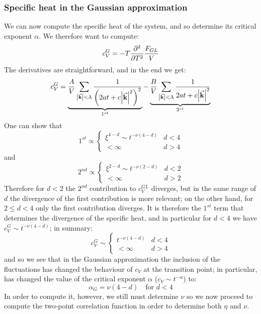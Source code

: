 \documentclass[../main/main.tex]{subfiles}
\begin{document}
\subsubsection{Specific heat in the Gaussian approximation}
We can now compute the specific heat of the system, and so determine its critical exponent \( \alpha  \). We therefore want to compute:
\begin{equation*}
    c_V^{G} = - T \pdv[2]{}{T} \frac{F_{GL}}{V}
\end{equation*}
The derivatives are straightforward, and in the end we get:
\begin{equation*}
  c_V^{G} =   \underbrace{\frac{A}{V} \sum_{\abs{\va{k}} < \Lambda  }^{}
  \frac{1}{ \qty(2 a t + c \abs{\va{k}}^2 )^2}}_{1^{st}}
    - \underbrace{ \frac{B}{V} \sum_{\abs{\va{k}}< \Lambda  }^{} \frac{1}{2 a t + c \abs{\va{k}}^2 }}_{2^{st}}
\end{equation*}
One can show that
\begin{equation*}
1^{st} \propto
  \begin{cases}
   \xi ^{4-d} \sim t^{-\nu (4-d)}  & d < 4\\
  < \infty & d > 4
  \end{cases}
\end{equation*}
and
\begin{equation*}
2^{nd} \propto
  \begin{cases}
   \xi ^{2-d} \sim t^{-\nu (2-d)}  & d < 2\\
  < \infty & d > 2
  \end{cases}
\end{equation*}
Therefore for \( d<2 \) the \( 2^{nd} \)  contribution to \( c_V^{GL} \) diverges, but in the same range of \( d \) the divergence of the first contribution is more relevant; on the other hand, for \( 2 \leq d < 4  \) only the first contribution diverges. It is therefore the \( 1^{st} \) term that determines the divergence of the specific heat, and in particular for \( d<4 \) we have \( c_V^{G}  \sim t^{-\nu (4-d)} \); in summary:
\begin{equation}
  c_V^G \sim \begin{cases}
    t^{-\nu (4-d)} & d < 4 \\
    <\infty & d > 4
\end{cases}
\end{equation}
and so we see that in the Gaussian approximation the inclusion of the fluctuations
has changed the behaviour of \( c_V \) at the transition point; in particular, has changed the value of the critical exponent \( \alpha  \) (\( c_V \sim t^{- \alpha } \)) to:
\begin{equation}
  \alpha_G = \nu (4-d) \quad \text{for } d < 4
\end{equation}
In order to compute it, however, we still must determine \( \nu  \)  so we now proceed to compute the two-point correlation function in order to determine both \( \eta  \) and \( \nu  \).
\end{document}

